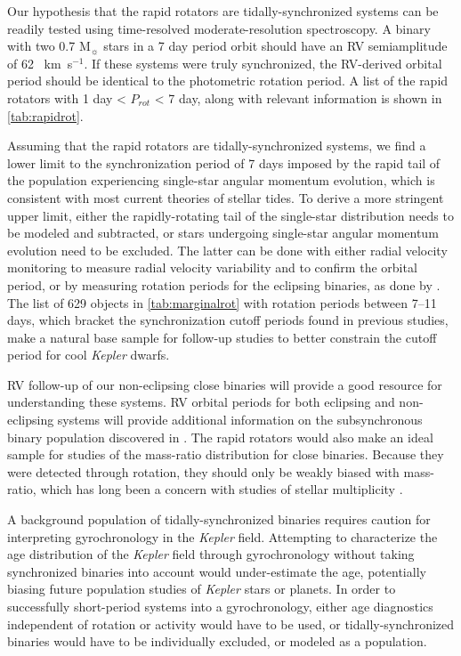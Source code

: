 \documentclass[twocolumn]{aastex6}
\newcommand{\Kepler}{\mbox{\textit{Kepler}}}
\newcommand{\kms}{\textrm{~km~s}\ensuremath{^{-1}}}
\begin{document}
Our hypothesis that the rapid rotators are tidally-synchronized systems can be
readily tested using time-resolved moderate-resolution spectroscopy. A binary
with two 0.7 M\(_\sun\) stars in a 7 day period orbit should have an RV
semiamplitude of 62 \kms. If these systems were truly synchronized, the
RV-derived orbital period should be identical to the photometric rotation
period. A list of the rapid rotators with 1 day < \(P_{rot}\) < 7 day, along
with relevant information is shown in \cref{tab:rapidrot}.

Assuming that the rapid rotators are tidally-synchronized systems, we find a
lower limit to the synchronization period of 7 days imposed by the rapid tail
of the population experiencing single-star angular momentum evolution, which is
consistent with most current theories of stellar tides. To derive a more
stringent upper limit, either the rapidly-rotating tail of the single-star
distribution needs to be modeled and subtracted, or stars undergoing 
single-star angular momentum evolution need to be excluded. The latter can be
done with either radial velocity monitoring to measure radial velocity
variability and to confirm the orbital period, or by measuring rotation periods
for the eclipsing binaries, as done by \citet{Lurie17}. The list of 629
objects in \cref{tab:marginalrot} with rotation periods between 7--11 days, 
which bracket the synchronization cutoff periods found in previous studies,
make a natural base sample for follow-up studies to better constrain the 
cutoff period for cool \Kepler{} dwarfs.

RV follow-up of our non-eclipsing close binaries will provide a good resource
for understanding these systems. RV orbital periods for both eclipsing and 
non-eclipsing systems 
will provide additional information on the subsynchronous binary population 
discovered in \citet{Lurie17}. The rapid rotators would also make an ideal 
sample for studies of the mass-ratio distribution for close binaries. Because 
they were detected through rotation, they should only be weakly biased with 
mass-ratio, which has long been a concern with studies of stellar multiplicity
\citep{Halbwachs03}.

A background population of tidally-synchronized binaries requires caution for
interpreting gyrochronology in the \Kepler{} field. Attempting to characterize
the age distribution of the \Kepler{} field through gyrochronology without 
taking synchronized binaries into account would under-estimate the age, 
potentially biasing future population studies of \Kepler{} stars or planets. 
In order to successfully short-period systems into a gyrochronology, either 
age diagnostics independent of rotation or activity would have to be used, or
tidally-synchronized binaries would have to be individually excluded, or
modeled as a population.
\end{document}
